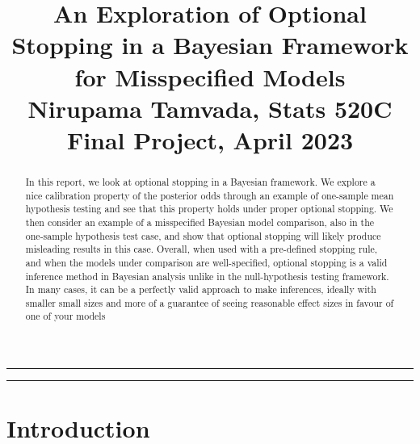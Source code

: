 \documentclass{article}
\title{\textbf{\huge An Exploration of Optional Stopping in a Bayesian Framework for Misspecified Models}\\
	Nirupama Tamvada, Stats 520C Final Project, April 2023}
\date{}
\begin{document}
\renewcommand{\abstractname}{Overview}
\pagestyle{empty}	
\newpage
\setcounter{page}{1}
\renewcommand{\thepage}{\arabic{page}}


	
	
\setlength{\parskip}{0.5em}
	
\maketitle
	
\noindent\rule{15cm}{0.5pt}
\begin{abstract}
 In this report, we look at optional stopping in a Bayesian framework. We explore a nice calibration property of the posterior odds through an example of one-sample mean hypothesis testing and see that this property holds under proper optional stopping. We then consider an example of a misspecified Bayesian model comparison, also in the one-sample hypothesis test case, and show that optional stopping will likely produce misleading results in this case. Overall, when used with a pre-defined stopping rule, and when the models under comparison are well-specified, optional stopping is a valid inference method in Bayesian analysis unlike in the null-hypothesis testing framework. In many cases, it can be a perfectly valid approach to make inferences, ideally with smaller small sizes and more of a guarantee of seeing reasonable effect sizes in favour of one of your models\ \\
			
\end{abstract}

\noindent\rule{15cm}{0.4pt}

\section{Introduction}
\end{document}
